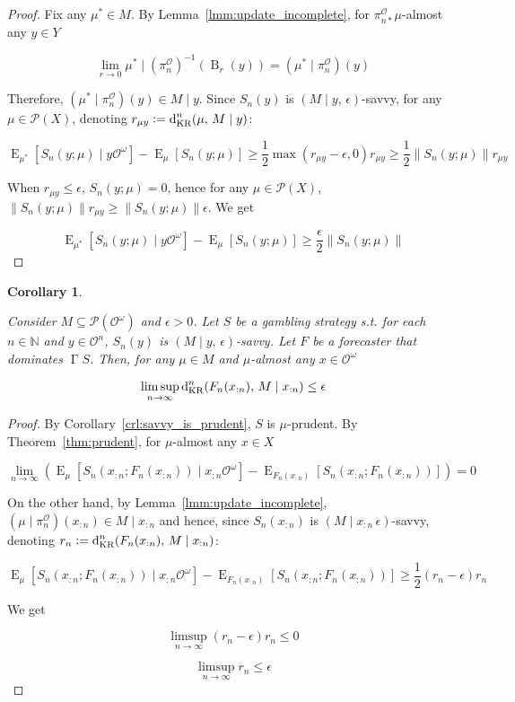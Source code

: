 \documentclass[11pt]{article}
\theoremstyle{definition}
\theoremstyle{plain}
\newtheorem{corollary}{Corollary}%
\newcommand{\Nats}{\mathbb{N}}
\newcommand{\N}[1]{\lVert #1 \rVert}
\newcommand{\B}{\operatorname{B}}
\DeclareMathOperator{\E}{E}
\newcommand{\PM}{\mathcal{P}}
\newcommand{\DKR}{\operatorname{d}_{\textnormal{KR}}}
\newcommand{\Ob}{\mathcal{O}}
\newcommand{\OO}{\Ob^\omega}
\newcommand{\PO}{\pi^\Ob}
\newcommand{\PMO}{\PM(\OO)}
\DeclareMathOperator{\PG}{\Gamma}
\begin{document}
\begin{proof}

Fix any $\mu^* \in M$. By Lemma~\ref{lmm:update_incomplete}, for $\PO_{n*} \mu$-almost any $y \in Y$

$$\lim_{r \rightarrow 0} {\mu^* \mid (\PO_n)^{-1}(\B_r(y))} = (\mu^* \mid \PO_n)(y)$$

Therefore, ${(\mu^* \mid \PO_n)(y) \in M \mid y}$. Since $S_n(y)$ is $(M \mid y,\, \epsilon)$-savvy, for any $\mu \in \PM(X)$, denoting $r_{\mu y}:=\DKR^n(\mu,\,M \mid y)$:

$$\E_{\mu^*}[S_n(y;\mu) \mid y\OO] - \E_{\mu}[S_n(y;\mu)] \geq \frac{1}{2} \max(r_{\mu y} - \epsilon, 0) r_{\mu y} \geq \frac{1}{2} \N{S_n(y;\mu)} r_{\mu y}$$

When $r_{\mu y} \leq \epsilon$, $S_n(y;\mu) = 0$, hence for any $\mu \in \PM(X)$, $\N{S_n(y;\mu)} r_{\mu y} \geq \N{S_n(y;\mu)} \epsilon$. We get

$$\E_{\mu^*}[S_n(y;\mu) \mid y\OO] - \E_{\mu}[S_n(y;\mu)] \geq \frac{\epsilon}{2} \N{S_n(y;\mu)}$$
\end{proof}

\begin{samepage}
\begin{corollary}
\label{crl:vicinity_convergence}

Consider $M \subseteq \PMO$ and $\epsilon > 0$. Let $S$ be a gambling strategy s.t. for each $n \in \Nats$ and $y \in \Ob^n$, $S_n(y)$ is $(M \mid y,\, \epsilon)$-savvy. Let $F$ be a forecaster that dominates $\PG{S}$. Then, for any $\mu \in M$ and $\mu$-almost any $x \in \OO$

\begin{equation}
\limsup_{n \rightarrow \infty} \DKR^n(F_n(x_{:n}),\, M \mid x_{:n}) \leq \epsilon
\end{equation}

\end{corollary}
\end{samepage}

\begin{proof}

By Corollary~\ref{crl:savvy_is_prudent}, $S$ is $\mu$-prudent. By Theorem~\ref{thm:prudent}, for $\mu$-almost any $x \in X$

$$\lim_{n \rightarrow \infty} {(\E_{\mu}[S_n(x_{:n};F_n(x_{:n})) \mid x_{:n}\OO]-\E_{F_n(x_{:n})}[S_n(x_{:n};F_n(x_{:n}))])} = 0$$

On the other hand, by Lemma~\ref{lmm:update_incomplete}, $(\mu \mid \PO_n)(x_{:n}) \in M \mid x_{:n}$ and hence, since $S_n(x_{:n})$ is $(M \mid x_{:n} \, \epsilon)$-savvy, denoting $r_n:=\DKR^n(F_n(x_{:n}),\, M \mid x_{:n})$: 

$$\E_{\mu}[S_n(x_{:n};F_n(x_{:n})) \mid x_{:n}\OO]-\E_{F_n(x_{:n})}[S_n(x_{:n};F_n(x_{:n}))] \geq \frac{1}{2} (r_{n} - \epsilon) r_n$$

We get

$$\limsup_{n \rightarrow \infty} {(r_{n} - \epsilon) r_n} \leq 0$$

$$\limsup_{n \rightarrow \infty} {r_n} \leq \epsilon$$
\end{proof}
\end{document}
